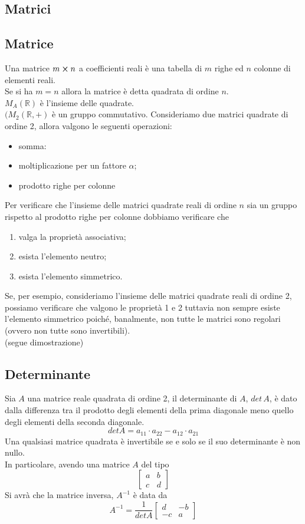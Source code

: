\begin{flushleft}
\section{Matrici}
\subsection{Matrice}
Una matrice $m\cross n$ a coefficienti reali è una tabella di $m$ righe ed $n$ colonne di elementi reali.\\
Se si ha $m = n$ allora la matrice è detta quadrata di ordine $n$.\\
$M_A(\mathbb{R})$ è l'insieme delle quadrate.\\
$(M_2(\mathbb{R}, +)$ è un gruppo commutativo.
Consideriamo due matrici quadrate di ordine 2, allora valgono le seguenti operazioni:
\begin{itemize}
    \item somma:
    \item moltiplicazione per un fattore $\alpha$;
    \item prodotto righe per colonne
\end{itemize}
Per verificare che l'insieme delle matrici quadrate reali di ordine $n$ sia un gruppo rispetto al prodotto righe per colonne dobbiamo verificare che
\begin{enumerate}
    \item valga la proprietà associativa;
    \item esista l'elemento neutro;
    \item esista l'elemento simmetrico.
\end{enumerate}
Se, per esempio, consideriamo l'insieme delle matrici quadrate reali di ordine 2, possiamo verificare che valgono le proprietà 1 e 2 tuttavia non sempre esiste l'elemento simmetrico poiché, banalmente, non tutte le matrici sono regolari (ovvero non tutte sono invertibili).\\
(segue dimostrazione)
\\ \vspace{300px}

\subsection{Determinante}
Sia $A$ una matrice reale quadrata di ordine 2, il determinante di $A$, $det\,A$, è dato dalla differenza tra il prodotto degli elementi della prima diagonale meno quello degli elementi della seconda diagonale.
\[detA = a_{11}\cdot a_{22} - a_{12}\cdot a_{21}\]
Una qualsiasi matrice quadrata è invertibile se e solo se il suo determinante è non nullo.\\
In particolare, avendo una matrice $A$ del tipo
\[\begin{bmatrix}
a & b \\
c & d 
\end{bmatrix}\]
Si avrà che la matrice inversa, $A^{-1}$ è data da
\[A^{-1} = \frac{1}{detA}\begin{bmatrix}
d & -b \\
-c & a 
\end{bmatrix}\]


\end{flushleft}
